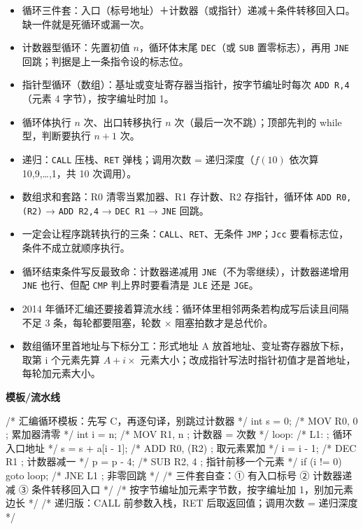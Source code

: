 \documentclass[10pt,a4paper]{ctexart}
\begin{document}
\begin{itemize}

\item 循环三件套：入口（标号地址）＋计数器（或指针）递减＋条件转移回入口。缺一件就是死循环或漏一次。

\item 计数器型循环：先置初值 $n$，循环体末尾 \texttt{DEC}（或 \texttt{SUB} 置零标志），再用 \texttt{JNE} 回跳；判据是上一条指令设的标志位。

\item 指针型循环（数组）：基址或变址寄存器当指针，按字节编址时每次 \texttt{ADD R,4}（元素 4 字节），按字编址时加 1。

\item 循环体执行 $n$ 次、出口转移执行 $n$ 次（最后一次不跳）；顶部先判的 while 型，判断要执行 $n+1$ 次。

\item 递归：\texttt{CALL} 压栈、\texttt{RET} 弹栈；调用次数 = 递归深度（$f(10)$ 依次算 10,9,…,1，共 10 次调用）。

\item 数组求和套路：R0 清零当累加器、R1 存计数、R2 存指针，循环体 \texttt{ADD R0,(R2)} → \texttt{ADD R2,4} → \texttt{DEC R1} → \texttt{JNE} 回跳。

\item 一定会让程序跳转执行的三条：\texttt{CALL}、\texttt{RET}、无条件 \texttt{JMP}；\texttt{Jcc} 要看标志位，条件不成立就顺序执行。

\item 循环结束条件写反最致命：计数器递减用 \texttt{JNE}（不为零继续），计数器递增用 \texttt{JNE} 也行、但配 \texttt{CMP} 判上界时要看清是 \texttt{JLE} 还是 \texttt{JGE}。

\item 2014 年循环汇编还要接着算流水线：循环体里相邻两条若构成写后读且间隔不足 3 条，每轮都要阻塞，轮数 × 阻塞拍数才是总代价。

\item 数组循环里首地址与下标分工：形式地址 A 放首地址、变址寄存器放下标，取第 i 个元素先算 $A+i\times$ 元素大小；改成指针写法时指针初值才是首地址，每轮加元素大小。

\end{itemize}

\textbf{模板/流水线}

\begin{codebox}
/* 汇编循环模板：先写 C，再逐句译，别跳过计数器 */
int s = 0;                     /* MOV R0, 0      ; 累加器清零   */
int i = n;                     /* MOV R1, n      ; 计数器 = 次数 */
loop:                          /* L1:            ; 循环入口地址 */
    s = s + a[i - 1];          /* ADD R0, (R2)   ; 取元素累加   */
    i = i - 1;                 /* DEC R1         ; 计数器减一   */
    p = p - 4;                 /* SUB R2, 4      ; 指针前移一个元素 */
    if (i != 0) goto loop;     /* JNE L1         ; 非零回跳     */
/* 三件套自查：① 有入口标号 ② 计数器递减 ③ 条件转移回入口 */
/* 按字节编址加元素字节数，按字编址加 1，别加元素边长 */
/* 递归版：CALL 前参数入栈，RET 后取返回值；调用次数 = 递归深度 */
\end{codebox}
\end{document}
